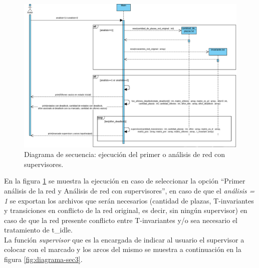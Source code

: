 \begin{figure}[H]
	\centering
	\includegraphics[width=\textwidth]{Figures/diagramasecuencia/Diagrama2.png}
	\caption{Diagrama de secuencia: ejecución del primer o análisis de red con supervisores.}
	\label{fig:diagrama-sec2}
\end{figure}
\bigskip

En la figura \ref{fig:diagrama-sec2} se muestra la ejecución en caso de seleccionar la opción “Primer análisis de la red y Análisis de red con supervisores”, en caso de que el \textit{análisis = 1} se exportan los archivos que serán necesarios (cantidad de plazas, T-invariantes y transiciones en conflicto de la red original, es decir, sin ningún supervisor) en caso de que la red presente conflicto entre T-invariantes y/o sea necesario el tratamiento de t\_idle. \\
La función \textit{supervisor} que es la encargada de indicar al usuario el supervisor a colocar con el marcado y los arcos del mismo se muestra a continuación en la figura \ref{fig:diagrama-sec3}.

